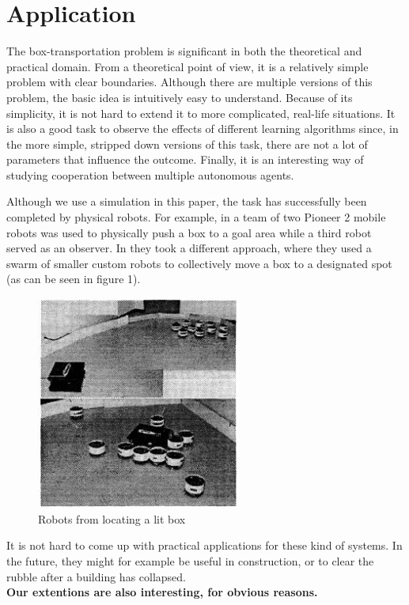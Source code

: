 \section{Application}
The box-transportation problem is significant in both the theoretical and practical domain. From a theoretical point of view, it is a relatively simple problem with clear boundaries. Although there are multiple versions of this problem, the basic idea is intuitively easy to understand. Because of its simplicity, it is not hard to extend it to more complicated, real-life situations. It is also a good task to observe the effects of different learning algorithms since, in the more simple, stripped down versions of this task, there are not a lot of parameters that influence the outcome. Finally, it is an interesting way of studying cooperation between multiple autonomous agents.

 Although we use a simulation in this paper, the task has successfully been completed by physical robots. For example, in \cite{mataric2002} a team of two Pioneer 2 mobile robots was used to physically push a box to a goal area while a third robot served as an observer. In \cite{kube1996} they took a different approach, where they used a swarm of smaller custom robots to collectively move a box to a designated spot (as can be seen in figure 1).
\begin{figure}[H]
\begin{center}
\caption{Robots from \cite{kube1996} locating a lit box}
\includegraphics[width = 0.6\textwidth]{images/swarmPushing.png}
\end{center}
\end{figure}
It is not hard to come up with practical applications for these kind of systems. In the future, they might for example be useful in construction, or to clear the rubble after a building has collapsed.\\
\textbf{Our extentions are also interesting, for obvious reasons.}
